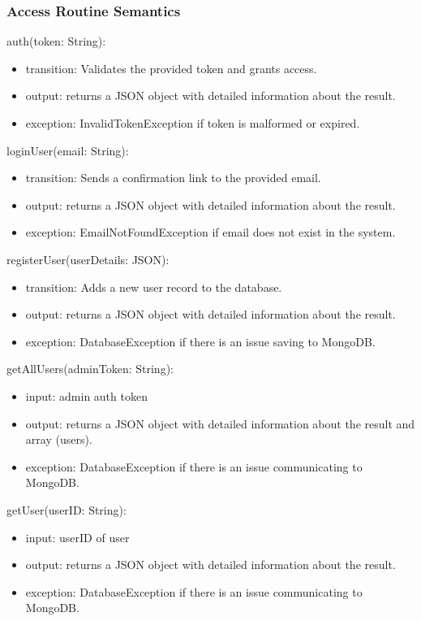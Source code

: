 \documentclass[12pt, titlepage]{article}
\begin{document}
\subsubsection{Access Routine Semantics}

\noindent auth(token: String):
\begin{itemize}
  \item transition: Validates the provided token and grants access.
  \item output: returns a JSON object with detailed information about the result.
  \item exception: InvalidTokenException if token is malformed or expired.
\end{itemize}

\noindent loginUser(email: String):
\begin{itemize}
  \item transition: Sends a confirmation link to the provided email.
  \item output: returns a JSON object with detailed information about the result.
  \item exception: EmailNotFoundException if email does not exist in the system.
\end{itemize}

\noindent registerUser(userDetails: JSON):
\begin{itemize}
  \item transition: Adds a new user record to the database.
  \item output: returns a JSON object with detailed information about the result.
  \item exception: DatabaseException if there is an issue saving to MongoDB.
\end{itemize}

\noindent getAllUsers(adminToken: String):
\begin{itemize}
  \item input: admin auth token 
  \item output: returns a JSON object with detailed information about the result and array (users).
  \item exception: DatabaseException if there is an issue communicating to MongoDB.
\end{itemize}

\noindent getUser(userID: String):
\begin{itemize}
  \item input: userID of user
  \item output: returns a JSON object with detailed information about the result.
  \item exception: DatabaseException if there is an issue communicating to MongoDB.
\end{itemize}
\end{document}
